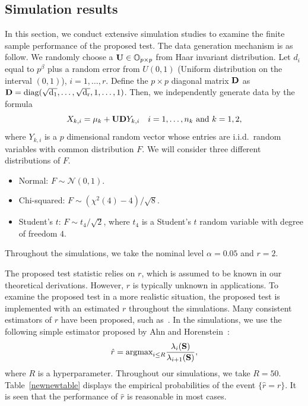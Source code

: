 \documentclass[times,sort&compress,3p]{elsarticle}
\newcommand{\mydiag}{\rm diag}
\theoremstyle{plain}
\theoremstyle{definition}
\theoremstyle{remark}
\begin{document}
\subsection{Simulation results}

In this section, we conduct extensive simulation studies to examine the finite sample performance of the proposed test.
The data generation mechanism is as follow.
We randomly choose a $\mathbf{U}\in\mathbb{O}_{p\times p}$ from Haar invariant distribution.
Let $d_{i}$ equal to $p^{\beta}$ plus a random error from $U(0,1)$ (Uniform distribution on the interval $(0,1)$), $i=1,\ldots, r$.
Define the $p\times p$ diagonal matrix $\mathbf{D}$ as $\BD=\mydiag(\sqrt{d_1},\ldots,\sqrt{d_r}, 1,\ldots, 1)$.
Then, we independently generate data by the formula
$$
X_{k,i}=\mu_k+\mathbf{U} \mathbf{D} Y_{k,i}\quad \text{$i=1,\ldots,n_k$ and $k=1,2$,}
$$
where $Y_{k,i}$ is a $p$ dimensional random vector whose entries are i.i.d.\ random variables with common distribution $F$.
We will consider three different distributions of $F$.
\begin{itemize}
    \item
        Normal: $F \sim \mathcal{N}(0,1)$.
    \item
        Chi-squared:  $F\sim (\chi^2(4)-4)/\sqrt{8}$.
    \item
        Student's $t$: $F\sim t_4/\sqrt{2}$, where $t_4$ is a Student's $t$ random variable  with degree of freedom $4$.
\end{itemize}
Throughout the simulations, we take the nominal level $\alpha=0.05$ and $r=2$.


The proposed test statistic relies on $r$, which is assumed to be known in our theoretical derivations.
However, $r$ is typically unknown in applications.
To examine the proposed test in a more realistic situation, the proposed test is implemented with an estimated $r$ throughout the simulations.
Many consistent estimators of $r$ have been proposed, such as~\cite{Ahn2009Eigenvalue,Bai2002,Cai2015Optimal}.
In the simulations, we use the following simple estimator proposed by Ahn and Horenstein~\cite{Ahn2009Eigenvalue}:
\begin{equation}\label{rEstimate}
    \hat{r}=\textrm{argmax}_{i\leq R}\frac{\lambda_i(\mathbf{S})}{\lambda_{i+1}(\mathbf{S})},
\end{equation}
where $R$ is a hyperparameter. Throughout our simulations, we take $R=50$.
Table~\ref{newnewtable} displays the empirical probabilities of the event $\{\hat{r}=r\}$.
It is seen that the performance of $\hat{r}$ is reasonable in most cases.
\end{document}
